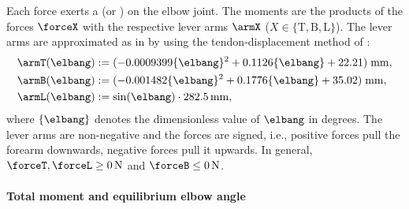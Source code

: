 Each force exerts a  (or ) on the elbow joint.
The moments are the products of the forces $\forceX$
with the respective lever arms $\armX$
($X \in \{\mathrm{T}, \mathrm{B}, \mathrm{L}\}$).
The lever arms are approximated as in
 by using
the tendon-displacement method of \cite{An84Determination}:
\begin{subequations}
  \begin{align}
    \armT(\elbang)
    &:= (-0.0009399 \{\elbang\}^2 + 0.1126 \{\elbang\} + 22.21)\;
    \si{\milli\meter},\\
    \armB(\elbang)
    &:= (-0.001482 \{\elbang\}^2 + 0.1776 \{\elbang\} + 35.02)\;
    \si{\milli\meter},\\
    \armL(\elbang)
    &:= \sin(\elbang) \cdot \SI{282.5}{\milli\meter},
  \end{align}
\end{subequations}
where $\{\elbang\}$ denotes the dimensionless value of $\elbang$
in degrees.
The lever arms are non-negative and the forces are signed, i.e.,
positive forces pull the forearm downwards,
negative forces pull it upwards.
In general, $\forceT, \forceL \ge \SI{0}{\newton}$ and
$\forceB \le \SI{0}{\newton}$.

\paragraph{Total moment and equilibrium elbow angle}

